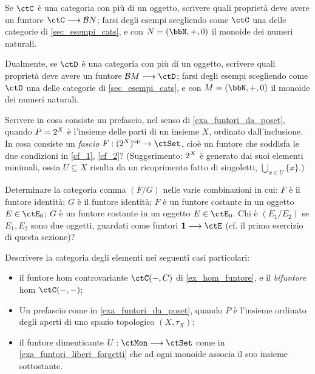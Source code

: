 \begin{esercizi}
	\item Se \(\ctC\) è una categoria con più di un oggetto, scrivere quali proprietà deve avere un funtore \(\ctC \fun \susp N\); farsi degli esempi scegliendo come \(\ctC\) una delle categorie di \ref{sec_esempi_cats}, e con \(N=(\bbN,+,0)\) il monoide dei numeri naturali.
	\item Dualmente, se \(\ctD\) è una categoria con più di un oggetto, scrivere quali proprietà deve avere un funtore \(\susp M \fun \ctD\); farsi degli esempi scegliendo come \(\ctD\) una delle categorie di \ref{sec_esempi_cats}, e con \(M = (\bbN,+,0)\) il monoide dei numeri naturali.
	\item Scrivere in cosa consiste un prefascio, nel senso di \ref{exa_funtori_da_poset}, quando \(P=2^{X}\) è l'insieme delle parti di un insieme \(X\), ordinato dall'inclusione. In cosa consiste un \emph{fascio} \(F : (\pow X)^\op\to\ctSet\), cioè un funtore che soddisfa le due condizioni in \ref{cf_1}, \ref{cf_2}? (Suggerimento: \(2^{X}\) è generato dai suoi elementi minimali, ossia \(U\subseteq X\) risulta da un ricoprimento fatto di singoletti, \(\bigcup_{x\in U} \{x\}\).)
	\item \label{gfdpgubai_5} Determinare la categoria comma \((F/G)\) nelle varie combinazioni in cui: \(F\) è il funtore identità; \(G\) è il funtore identità; \(F\) è un funtore costante in un oggetto \(E\in\ctE_0\); \(G\) è un funtore costante in un oggetto \(E\in\ctE_0\). Chi è \((E_1/E_2)\) se \(E_1,E_2\) sono due oggetti, guardati come funtori \(\ctTerm \fun\ctE\) (cf. il primo esercizio di questa sezione)?
	\item Descrivere la categoria degli elementi nei seguenti casi particolari:
	\begin{itemize}
		\item il funtore hom controvariante \(\Hom\ctC(-,C)\) di \ref{ex_hom_funtore}, e il \emph{bifuntore} hom \(\Hom\ctC(-,-)\);
		\item Un prefascio come in \ref{exa_funtori_da_poset}, quando \(P\) è l'insieme ordinato degli aperti di uno spazio topologico \((X,\tau_X)\);
		\item il funtore dimenticante \(U : \ctMon \fun\ctSet\) come in \ref{exa_funtori_liberi_forgetti} che ad ogni monoide associa il suo insieme sottostante.
	\end{itemize}
\end{esercizi}
